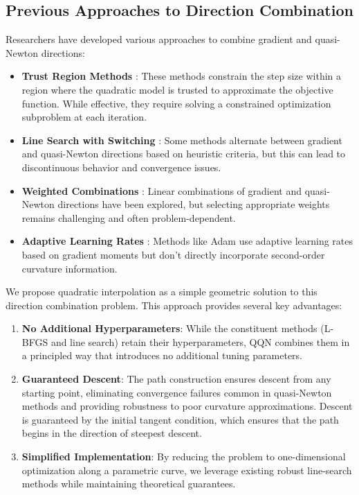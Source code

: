 \hypertarget{previous-approaches-to-direction-combination}{%
\subsection{Previous Approaches to Direction Combination}\label{previous-approaches-to-direction-combination}}

Researchers have developed various approaches to combine gradient and quasi-Newton directions:

\begin{itemize}
\item
  \textbf{Trust Region Methods} \citep{conn2000trust}: These methods constrain the step size within a region where the quadratic model is trusted to approximate the objective function. While effective, they require solving a constrained optimization subproblem at each iteration.
\item
  \textbf{Line Search with Switching} \citep{morales2000automatic}: Some methods alternate between gradient and quasi-Newton directions based on heuristic criteria, but this can lead to discontinuous behavior and convergence issues.
\item
  \textbf{Weighted Combinations} \citep{biggs1973minimization}: Linear combinations of gradient and quasi-Newton directions have been explored, but selecting appropriate weights remains challenging and often problem-dependent.
\item
  \textbf{Adaptive Learning Rates} \citep{kingma2015adam}: Methods like Adam use adaptive learning rates based on gradient moments but don't directly incorporate second-order curvature information.
\end{itemize}

We propose quadratic interpolation as a simple geometric solution to this direction combination problem.
This approach provides several key advantages:

\begin{enumerate}
\def\labelenumi{\arabic{enumi}.}
\item
  \textbf{No Additional Hyperparameters}: While the constituent methods (L-BFGS and line search) retain their hyperparameters, QQN combines them in a principled way that introduces no additional tuning parameters.
\item
  \textbf{Guaranteed Descent}: The path construction ensures descent from any starting point, eliminating convergence failures common in quasi-Newton methods and providing robustness to poor curvature approximations.
  Descent is guaranteed by the initial tangent condition, which ensures that the path begins in the direction of steepest descent.
\item
  \textbf{Simplified Implementation}: By reducing the problem to one-dimensional optimization along a parametric curve, we leverage existing robust line-search methods while maintaining theoretical guarantees.
\end{enumerate}

